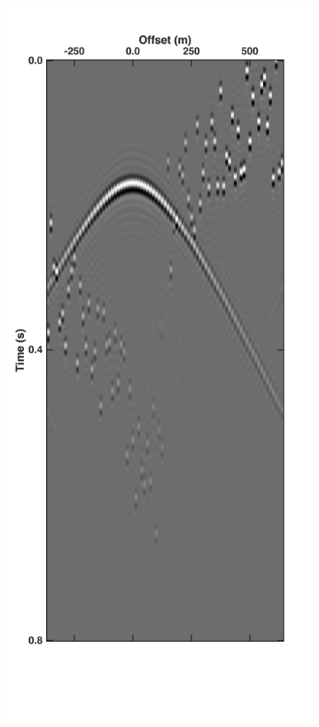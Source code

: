 \begin{figure}
	\centering
	\begin{subfigure}[t]{0.25\textwidth}
		\includegraphics[width=\textwidth]{Plots/Mahdad/5iter/Pseudo-DeblendedCRG_rec30}	

\end{subfigure}
\end{figure}
